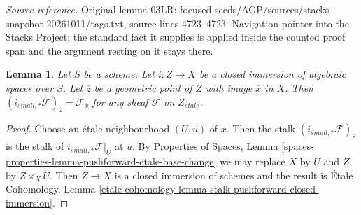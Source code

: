 \documentclass[10pt,a4paper]{amsart}
\theoremstyle{plain}
\newtheorem{lemma}[subsection]{Lemma}
\theoremstyle{definition}
\theoremstyle{remark}
\numberwithin{equation}{subsection}
\def\etale{{\acute{e}tale}}
\begin{document}
\noindent\textit{Source reference.} Original lemma 03LR: focused-seeds/AGP/sources/stacks-snapshot-20261011/tags.txt, source lines 4723--4723. Navigation pointer into the Stacks Project; the standard fact it supplies is applied inside the counted proof span and the argument resting on it stays there.\par\medskip
\begin{lemma}
\label{lemma-stalk-push-closed}
Let $S$ be a scheme. Let $i : Z \to X$ be a closed immersion of algebraic
spaces over $S$. Let $\overline{z}$ be a geometric point of $Z$ with
image $\overline{x}$ in $X$. Then
$(i_{small, *}\mathcal{F})_{\overline{z}} = \mathcal{F}_{\overline{x}}$
for any sheaf $\mathcal{F}$ on $Z_\etale$.
\end{lemma}

\begin{proof}
Choose an \'etale neighbourhood $(U, \overline{u})$ of $\overline{x}$.
Then the stalk $(i_{small, *}\mathcal{F})_{\overline{z}}$
is the stalk of $i_{small, *}\mathcal{F}|_U$ at $\overline{u}$.
By Properties of Spaces,
Lemma \ref{spaces-properties-lemma-pushforward-etale-base-change}
we may replace $X$ by $U$ and $Z$ by $Z \times_X U$.
Then $Z \to X$ is a closed immersion of schemes and the result is
\'Etale Cohomology, Lemma
\ref{etale-cohomology-lemma-stalk-pushforward-closed-immersion}.
\end{proof}
\end{document}
